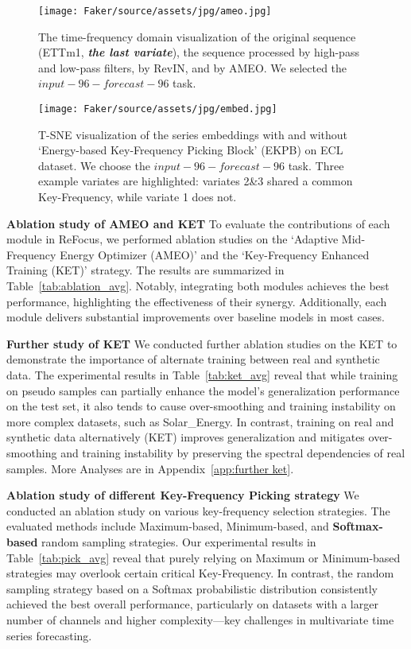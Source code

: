 \begin{figure*}[!h]
  \centering
  \texttt{[image: Faker/source/assets/jpg/ameo.jpg]}
  \caption{\small{The time-frequency domain visualization of the original sequence (ETTm1, \textbf{\textit{the last variate}}), the sequence processed by high-pass and low-pass filters, by RevIN, and by AMEO. We selected the $input-96-forecast-96$ task.}}
  \label{fig:ameo}
\end{figure*}
\begin{figure}[!h]
  \centering
  \texttt{[image: Faker/source/assets/jpg/embed.jpg]}
  \caption{\small{T-SNE visualization of the series embeddings with and without `Energy-based Key-Frequency Picking Block' (EKPB) on ECL dataset. We choose the $input-96-forecast-96$ task. Three example variates are highlighted: variates 2\&3 shared a common Key-Frequency, while variate 1 does not.}}
  \label{fig:embed}
  \vspace{-5mm} 
\end{figure}

\textbf{Ablation study of AMEO and KET \quad} To evaluate the contributions of each module in ReFocus, we performed ablation studies on the `Adaptive Mid-Frequency Energy Optimizer (AMEO)' and the `Key-Frequency Enhanced Training (KET)' strategy. The results are summarized in Table~\ref{tab:ablation_avg}. Notably, integrating both modules achieves the best performance, highlighting the effectiveness of their synergy. Additionally, each module delivers substantial improvements over baseline models in most cases.

\textbf{Further study of KET \quad}  We conducted further ablation studies on the KET to demonstrate the importance of alternate training between real and synthetic data. The experimental results in Table~\ref{tab:ket_avg} reveal that while training on pseudo samples can partially enhance the model's generalization performance on the test set, it also tends to cause over-smoothing and training instability on more complex datasets, such as Solar\_Energy. In contrast, training on real and synthetic data alternatively (KET) improves generalization and mitigates over-smoothing and training instability by preserving the spectral dependencies of real samples. More Analyses are in Appendix~\ref{app:further ket}. 

\textbf{Ablation study of different Key-Frequency Picking strategy \quad} We conducted an ablation study on various key-frequency selection strategies. The evaluated methods include Maximum-based, Minimum-based, and \textbf{Softmax-based} random sampling strategies. Our experimental results in Table~\ref{tab:pick_avg} reveal that purely relying on Maximum or Minimum-based strategies may overlook certain critical Key-Frequency. In contrast, the random sampling strategy based on a Softmax probabilistic distribution consistently achieved the best overall performance, particularly on datasets with a larger number of channels and higher complexity—key challenges in multivariate time series forecasting. 

